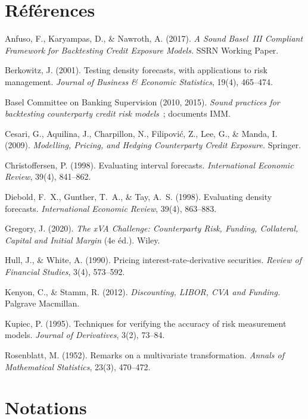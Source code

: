 \documentclass[11pt,a4paper]{article}
\theoremstyle{remark}
\begin{document}
\appendix

\section*{Références}
\begin{description}[leftmargin=1.5em,style=nextline,nosep]
  \item Anfuso, F., Karyampas, D., \& Nawroth, A. (2017). \emph{A Sound Basel~III Compliant Framework for Backtesting Credit Exposure Models.} SSRN Working Paper.
  \item Berkowitz, J. (2001). Testing density forecasts, with applications to risk management. \emph{Journal of Business \& Economic Statistics}, 19(4), 465--474.
  \item Basel Committee on Banking Supervision (2010, 2015). \emph{Sound practices for backtesting counterparty credit risk models}~; documents IMM.
  \item Cesari, G., Aquilina, J., Charpillon, N., Filipovi\'c, Z., Lee, G., \& Manda, I. (2009). \emph{Modelling, Pricing, and Hedging Counterparty Credit Exposure.} Springer.
  \item Christoffersen, P. (1998). Evaluating interval forecasts. \emph{International Economic Review}, 39(4), 841--862.
  \item Diebold, F.~X., Gunther, T.~A., \& Tay, A.~S. (1998). Evaluating density forecasts. \emph{International Economic Review}, 39(4), 863--883.
  \item Gregory, J. (2020). \emph{The xVA Challenge: Counterparty Risk, Funding, Collateral, Capital and Initial Margin} (4e éd.). Wiley.
  \item Hull, J., \& White, A. (1990). Pricing interest-rate-derivative securities. \emph{Review of Financial Studies}, 3(4), 573--592.
  \item Kenyon, C., \& Stamm, R. (2012). \emph{Discounting, LIBOR, CVA and Funding.} Palgrave Macmillan.
  \item Kupiec, P. (1995). Techniques for verifying the accuracy of risk measurement models. \emph{Journal of Derivatives}, 3(2), 73--84.
  \item Rosenblatt, M. (1952). Remarks on a multivariate transformation. \emph{Annals of Mathematical Statistics}, 23(3), 470--472.
\end{description}

\section{Notations}
\label{app:notations}
\end{document}
